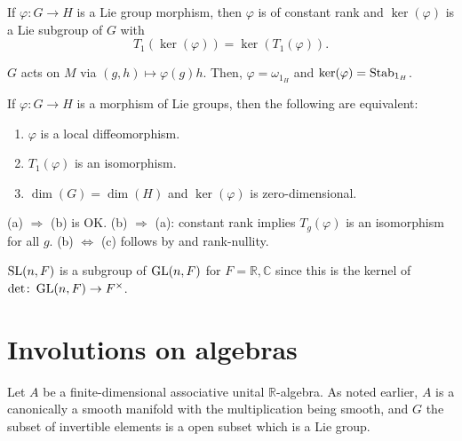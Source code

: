 \documentclass[12pt]{article}
\begin{document}
\begin{cor} \label{cor:image-kernel-morphism-properties}
	If $\varphi \colon G \to H$ is a Lie group morphism, then $\varphi$ is of constant rank and $\ker(\varphi)$ is a Lie subgroup of $G$ with 
	\begin{equation*} 
		T_{1}(\ker(\varphi)) = \ker(T_{1}(\varphi)).
	\end{equation*}
\end{cor}
\begin{sketch} 
	$G$ acts on $M$ via $(g, h) \mapsto \varphi(g) h$. Then, $\varphi = \omega_{1_{H}}$ and $\ker(\varphi) = \operatorname{Stab}_{1_{H}}$.
\end{sketch}

\begin{cor} \label{cor:local-diffeo-characterisation}
	If $\varphi \colon G \to H$ is a morphism of Lie groups, then the following are equivalent:
	\begin{enumerate}[label=(\alph*)]
		\item $\varphi$ is a local diffeomorphism.
		\item $T_{1}(\varphi)$ is an isomorphism.
		\item $\dim(G) = \dim(H)$ and $\ker(\varphi)$ is zero-dimensional.
	\end{enumerate}
\end{cor}
\begin{sketch}
	(a) $\Rightarrow$ (b) is OK. \newline
	(b)	$\Rightarrow$ (a): constant rank implies $T_{g}(\varphi)$ is an isomorphism for all $g$. \newline
	(b) $\Leftrightarrow$ (c) follows by  and rank-nullity.
\end{sketch}

\begin{ex} \label{ex:SL-is-subgroup}
	$\operatorname{SL}(n, F)$ is a subgroup of $\operatorname{GL}(n, F)$ for $F = \mathbb{R}, \mathbb{C}$ since this is the kernel of $\det \colon \operatorname{GL}(n, F) \to F^{\times}$.
\end{ex}

\section{Involutions on algebras}

Let $A$ be a finite-dimensional associative unital $\mathbb{R}$-algebra. 
As noted earlier, $A$ is a canonically a smooth manifold with the multiplication being smooth, 
and $G$ the subset of invertible elements is a open subset which is a Lie group.
\end{document}
